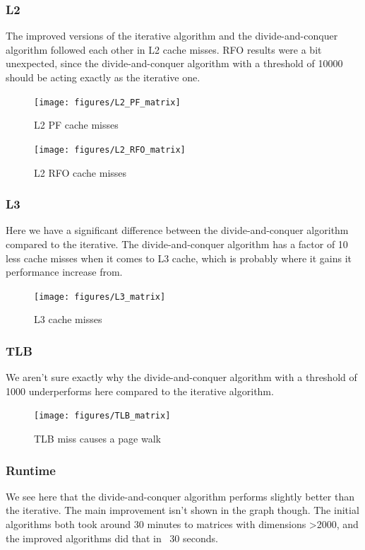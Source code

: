 \documentclass{article}
\begin{document}
\subsubsection{L2}
The improved versions of the iterative algorithm and the divide-and-conquer algorithm followed each other in L2 cache misses. RFO results were a bit unexpected, since the divide-and-conquer algorithm with a threshold of 10000 should be acting exactly as the iterative one.
\begin{figure}[H]
  \centering
  \texttt{[image: figures/L2\_PF\_matrix]}
  \caption{L2 PF cache misses}
  \label{fig:L2_PF_matrix}
\end{figure}

\begin{figure}[H]
  \centering
  \texttt{[image: figures/L2\_RFO\_matrix]}
  \caption{L2 RFO cache misses}
  \label{fig:L2_RFO_matrix}
\end{figure}

\subsubsection{L3}
Here we have a significant difference between the divide-and-conquer algorithm compared to the iterative. The divide-and-conquer algorithm has a factor of 10 less cache misses when it comes to L3 cache, which is probably where it gains it performance increase from.

\begin{figure}[H]
  \centering
  \texttt{[image: figures/L3\_matrix]}
  \caption{L3 cache misses}
  \label{fig:L3_matrix}
\end{figure}

\subsubsection{TLB}
We aren't sure exactly why the divide-and-conquer algorithm with a threshold of 1000 underperforms here compared to the iterative algorithm.

\begin{figure}[H]
  \centering
  \texttt{[image: figures/TLB\_matrix]}
  \caption{TLB miss causes a page walk}
  \label{fig:TLB_matrix}
\end{figure}

\subsubsection{Runtime}
We see here that the divide-and-conquer algorithm performs slightly better than the iterative. The main improvement isn't shown in the graph though. The initial algorithms both took around 30 minutes to matrices with dimensions >2000, and the improved algorithms did that in ~30 seconds.
\end{document}
